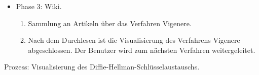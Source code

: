 \documentclass{article}
\begin{document}
\begin{itemize}[label={}]
 \item Phase 3: Wiki.

	\begin{enumerate}
	 \item Sammlung an Artikeln über das Verfahren Vigenere.
	 \item Nach dem Durchlesen ist die Visualisierung des Verfahrens Vigenere abgeschlossen. Der Benutzer wird zum nächsten Verfahren weitergeleitet.
 	\end{enumerate}

\end{itemize}

\begin{FA}[start=130]
 \item Prozess: Visualisierung des Diffie-Hellman-Schlüsselaustauschs.
\end{FA}
\end{document}
